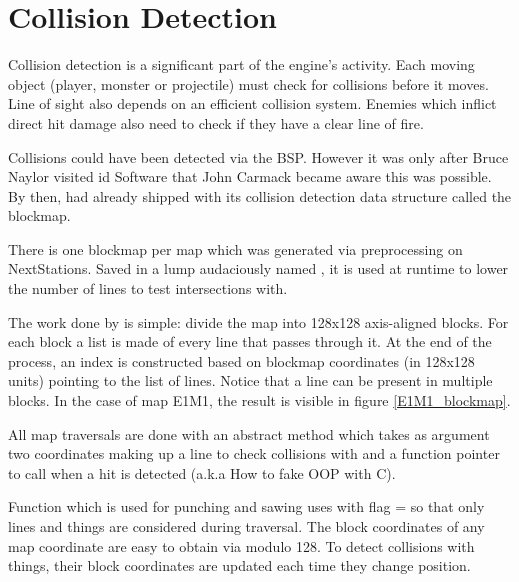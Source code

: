 \section{Collision Detection} \label{blockmapdetails}
Collision detection is a significant part of the engine's activity. Each moving object (player, monster or projectile) must check for collisions before it moves. Line of sight also depends on an efficient collision system. Enemies which inflict direct hit damage also need to check if they have a clear line of fire.\\
\par
Collisions could have been detected via the BSP. However it was only after Bruce Naylor visited id Software that John Carmack became aware this was possible. By then, \doom{} had already shipped with its collision detection data structure called the blockmap.\\
\par
\vspace{10pt}
\par
There is one blockmap per map which was generated via  preprocessing on NextStations. Saved in a lump audaciously named , it is used at runtime to lower the number of lines to test intersections with.\\
\par
The work done by  is simple: divide the map into 128x128 axis-aligned blocks. For each block a list is made of every line that passes through it. At the end of the process, an index is constructed based on blockmap coordinates (in 128x128 units) pointing to the list of lines. Notice that a line can be present in multiple blocks. In the case of map E1M1, the result is visible in figure \ref{E1M1_blockmap}.


All map traversals are done with an abstract method  which takes as argument two coordinates making up a line to check collisions with and a function pointer to call when a hit is detected (a.k.a How to fake OOP with C).\\
\par
{}
\par
Function  which is used for punching and sawing uses  with flag =  so that only lines and things are considered during traversal. The block coordinates of any map coordinate are easy to obtain via modulo 128. To detect collisions with things, their block coordinates are updated each time they change position.\\
\par
{}
